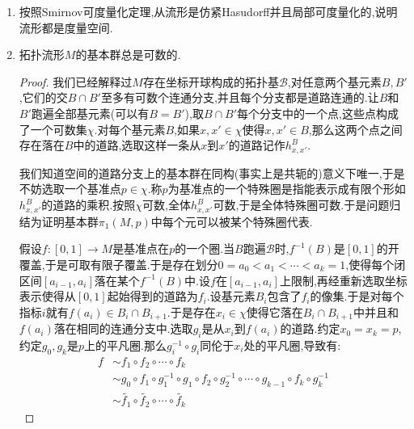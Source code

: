 \begin{enumerate}
\begin{proof}
    	\qquad
    	
    	我们接下来证明如果$X$是具有exhaustion的Hausdorff空间,则$X$是仿紧致的.任取开覆盖$\{U_{\alpha}:\alpha\in J\}$,记exhaustion为$\{X_i,i\ge1\}$,记$K_1=\overline{X_2},K_n=\overline{X_{n+1}}\backslash X_{n},n\ge2$,则每个$K_i$是紧集.记$V_1=X_3,V_n=X_{n+2}\backslash\overline{X_{n-1}},n\ge2$,则每个$V_i$是开集,并且$X=\cup V_i=\cup K_i$.对于任意一个$K_n$,有$\{U_{\alpha}\cap V_n:\alpha\in J\}$构成一个开覆盖,由紧性可取有限子覆盖,$n$取遍全体正整数,得到可数个开集$\mathscr{A}$,它们覆盖整个空间,每个开集位于某个紧集$\overline{V_n}$中,于是它是预紧的.最后说明$\mathscr{A}$是局部有限的,这是因为,对于任意一点$p\in X$,不妨设$p\in K_n$,$\mathscr{A}$中每个开集位于某个$V_n$之中,并且每个$V_n$之中只有$\mathscr{A}$中有限个开集.于是取$p$的开邻域$V_n$只和$\mathscr{A}$中有限个开集相交.
    \end{proof}
    \item 按照Smirnov可度量化定理,从流形是仿紧Hasudorff并且局部可度量化的,说明流形都是度量空间.
    \item 拓扑流形$M$的基本群总是可数的.
    \begin{proof}
    	
    	我们已经解释过$M$存在坐标开球构成的拓扑基$\mathscr{B}$,对任意两个基元素$B,B'$,它们的交$B\cap B'$至多有可数个连通分支,并且每个分支都是道路连通的.让$B$和$B'$跑遍全部基元素(可以有$B=B'$),取$B\cap B'$每个分支中的一个点,这些点构成了一个可数集$\chi$.对每个基元素$B$,如果$x,x'\in\chi$使得$x,x'\in B$,那么这两个点之间存在落在$B$中的道路,选取这样一条从$x$到$x'$的道路记作$h_{x,x'}^B$.
    	
    	\qquad
    	
    	我们知道空间的道路分支上的基本群在同构(事实上是共轭的)意义下唯一,于是不妨选取一个基准点$p\in\chi$.称$p$为基准点的一个特殊圈是指能表示成有限个形如$h_{x,x'}^B$的道路的乘积.按照$\chi$可数,全体$h_{x,x'}^B$可数,于是全体特殊圈可数.于是问题归结为证明基本群$\pi_1(M,p)$中每个元可以被某个特殊圈代表.
    	
    	\qquad
    	
    	假设$f:[0,1]\to M$是基准点在$p$的一个圈.当$B$跑遍$\mathscr{B}$时,$f^{-1}(B)$是$[0,1]$的开覆盖,于是可取有限子覆盖.于是存在划分$0=a_0<a_1<\cdots<a_k=1$,使得每个闭区间$[a_{i-1},a_i]$落在某个$f^{-1}(B)$中.设$f$在$[a_{i-1},a_i]$上限制,再经重新选取坐标表示使得从$[0,1]$起始得到的道路为$f_i$.设基元素$B_i$包含了$f_i$的像集.于是对每个指标$i$就有$f(a_i)\in B_i\cap B_{i+1}$.于是存在$x_i\in\chi$使得它落在$B_i\cap B_{i+1}$中并且和$f(a_i)$落在相同的连通分支中.选取$g_i$是从$x_i$到$f(a_i)$的道路.约定$x_0=x_k=p$,约定$g_0,g_k$是$p$上的平凡圈.那么$g_i^{-1}\circ g_i$同伦于$x_i$处的平凡圈,导致有:
    	\begin{align*}
    	f&\sim f_1\circ f_2\circ\cdots\circ f_k\\&\sim g_0\circ f_1\circ g_1^{-1}\circ g_1\circ f_2\circ g_2^{-1}\circ\cdots\circ g_{k-1}\circ f_k\circ g_k^{-1}\\&\sim\widetilde{f_1}\circ\widetilde{f_2}\circ\cdots\circ\widetilde{f_k}
    	\end{align*}
    	

\end{proof}
\end{enumerate}
